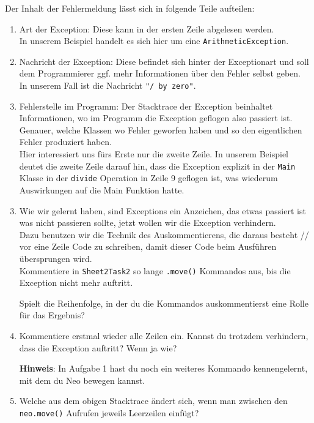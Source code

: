\begin{Infobox}[Exception]
    Der Inhalt der Fehlermeldung lässt sich in folgende Teile aufteilen:

\begin{enumerate}[label=\roman*)]
\item Art der Exception: Diese kann in der ersten Zeile abgelesen werden.\\
In unserem Beispiel handelt es sich hier um eine \lstinline{ArithmeticException}.
\item Nachricht der Exception: Diese befindet sich hinter der Exceptionart und soll dem Programmierer ggf. mehr Informationen über den Fehler selbst geben.\\
In unserem Fall ist die Nachricht \lstinline{"/ by zero"}.
\item Fehlerstelle im Programm: Der Stacktrace der Exception beinhaltet Informationen, wo im Programm die Exception geflogen also passiert ist. Genauer, welche Klassen wo Fehler geworfen haben und so den eigentlichen Fehler produziert haben.\\
Hier interessiert uns fürs Erste nur die zweite Zeile. In unserem Beispiel deutet die zweite Zeile darauf hin, dass die Exception explizit in der \lstinline{Main} Klasse in der \lstinline{divide}
Operation in Zeile 9 geflogen ist, was wiederum Auswirkungen auf die Main Funktion hatte.
    \end{enumerate}

\end{Infobox}


\begin{enumerate}[label=\alph*)] \setcounter{enumi}{2}

    \item Wie wir gelernt haben, sind Exceptions ein Anzeichen, das etwas passiert ist was nicht passieren sollte, jetzt wollen wir die Exception verhindern.\\
Dazu benutzen wir die Technik des Auskommentierens, die daraus besteht // vor eine Zeile Code zu schreiben, damit dieser Code beim Ausführen übersprungen wird.\\
Kommentiere in \lstinline{Sheet2Task2} so lange \lstinline{.move()} Kommandos aus, bis die Exception nicht mehr auftritt.

Spielt die Reihenfolge, in der du die Kommandos auskommentierst eine Rolle für das Ergebnis?
\item Kommentiere erstmal wieder alle Zeilen ein.
Kannst du trotzdem verhindern, dass die Exception auftritt?
Wenn ja wie?

\textbf{Hinweis}: In Aufgabe 1 hast du noch ein weiteres Kommando kennengelernt, mit dem du Neo bewegen kannst.

\item \optional Welche  aus dem obigen Stacktrace ändert sich, wenn man zwischen den \lstinline{neo.move()} Aufrufen jeweils Leerzeilen einfügt?
\end{enumerate}
 
